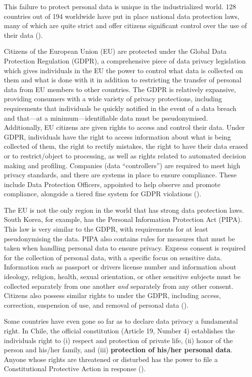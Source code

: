 \documentclass[water,article,submit,moreauthors,pdftex]{mdpi}
\begin{document}
This failure to protect personal data is unique in the industrialized
world. 128 countries out of 194 worldwide have put in place national
data protection laws, many of which are quite strict and offer citizens
significant control over the use of their data (\citet{unctad}).

Citizens of the European Union (EU) are protected under the Global Data
Protection Regulation (GDPR), a comprehensive piece of data privacy
legislation which gives individuals in the EU the power to control what
data is collected on them and what is done with it in addition to
restricting the transfer of personal data from EU members to other
countries. The GDPR is relatively expansive, providing consumers with a
wide variety of privacy protections, including requirements that
individuals be quickly notified in the event of a data breach and
that---at a minimum---identifiable data must be pseudonymised.
Additionally, EU citizens are given rights to access and control their
data. Under GDPR, individuals have the right to access information about
what is being collected of them, the right to rectify mistakes, the
right to have their data erased or to restrict/object to processing, as
well as rights related to automated decision making and profiling.
Companies (data ``controllers'') are required to meet high privacy
standards, and there are systems in place to ensure compliance. These
include Data Protection Officers, appointed to help observe and promote
compliance, alongside a tiered fine system for GDPR violations
(\citet{GDPR-text}).

The EU is not the only region in the world that has strong data
protection laws. South Korea, for example, has the Personal Information
Protection Act (PIPA). This law is very similar to the GDPR, with
requirements for at least pseudonymising the data. PIPA also contains
rules for measures that must be taken when handling personal data to
ensure privacy. Express consent is required for the collection of
personal data, with a specific focus on sensitive data. Information such
as passport or drivers license number and information about ideology,
religion, health, sexual orientation, or other sensitive subjects must
be collected separately from one another \emph{and} separately from any
other consent. Citizens also possess similar rights to under the GDPR,
including access, correction, suspension of use, and removal of personal
data (\citet{data-guidance}).

Some countries have even gone so far as to declare data privacy a
fundamental right. In Chile, the official constitution (Article 19,
Number 4) establishes the individuals right to (i) respect and
protection of private life, (ii) honor of the person and his/her family,
and (iii) \textbf{protection of his/her personal data}. Anyone whose
rights are threatened or disturbed has the power to file a
Constitutional Protective Action in response (\citet{chile}).
\end{document}
